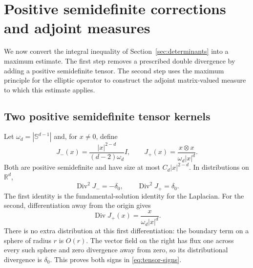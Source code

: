 \documentclass[11pt,a4paper,reqno]{amsart}
\theoremstyle{plain}
\theoremstyle{remark}
\numberwithin{equation}{section}
\newcommand{\R}{\mathbb R}
\DeclareMathOperator{\Div}{Div}
\begin{document}
\section{Positive semidefinite corrections and adjoint measures}\label{sec:adjoint}
We now convert the integral inequality of Section~\ref{sec:determinants} into a maximum estimate. The first step removes a prescribed double divergence by adding a positive semidefinite tensor. The second step uses the maximum principle for the elliptic operator to construct the adjoint matrix-valued measure to which this estimate applies.

\subsection{Two positive semidefinite tensor kernels}
Let $\omega_d=|\mathbb S^{d-1}|$ and, for $x\ne0$, define
\begin{equation}\label{eq:fundamental-tensors}
 J_-(x)=\frac{|x|^{2-d}}{(d-2)\omega_d}I,
 \qquad
 J_+(x)=\frac{x\otimes x}{\omega_d|x|^d}.
\end{equation}
Both are positive semidefinite and have size at most $C_d|x|^{2-d}$. In distributions on $\R^d$,
\begin{equation}\label{eq:tensor-signs}
 \Div^2J_-=-\delta_0,\qquad \Div^2J_+=\delta_0.
\end{equation}
The first identity is the fundamental-solution identity for the Laplacian. For the second, differentiation away from the origin gives
\[
 \Div J_+(x)=\frac{x}{\omega_d|x|^d}.
\]
There is no extra distribution at this first differentiation: the boundary term on a sphere of radius $r$ is $O(r)$. The vector field on the right has flux one across every such sphere and zero divergence away from zero, so its distributional divergence is $\delta_0$. This proves both signs in \eqref{eq:tensor-signs}.
\end{document}
